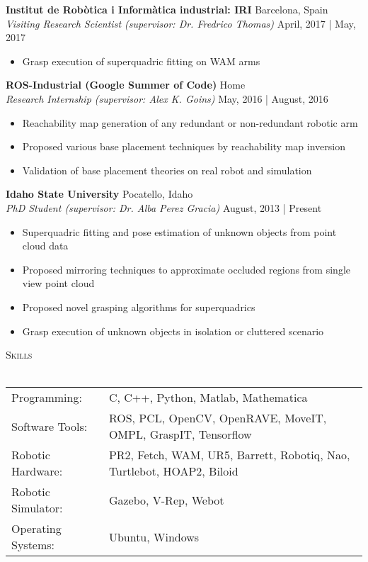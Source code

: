 \documentclass[a4paper]{article}
\newcommand{\lineunder} {
    \vspace*{-8pt} \\
    \hspace*{-18pt} \hrulefill \\
}
\newcommand{\header} [1] {
    {\hspace*{-18pt}\vspace*{6pt} \textsc{#1}}
    \vspace*{-6pt} \lineunder
}
\begin{document}
\textbf{Institut de Rob\`{o}tica i Inform\`{a}tica industrial: IRI} \hfill Barcelona, Spain\\
\textit{Visiting Research Scientist (supervisor: Dr. Fredrico Thomas)} \hfill April, 2017 | May, 2017\\
\vspace{-1mm}
\begin{itemize} \itemsep 1pt
	\item Grasp execution of superquadric fitting on WAM arms
\end{itemize}

\textbf{ROS-Industrial (Google Summer of Code)} \hfill Home\\
\textit{Research Internship (supervisor: Alex K. Goins)} \hfill May, 2016 | August, 2016\\
\vspace{-1mm}
\begin{itemize} \itemsep 1pt
	\item Reachability map generation of any redundant or non-redundant robotic arm
	\item Proposed various base placement techniques by reachability map inversion
	\item Validation of base placement theories on real robot and simulation
\end{itemize}

\textbf{Idaho State University} \hfill Pocatello, Idaho\\
\textit{PhD Student (supervisor: Dr. Alba Perez Gracia)} \hfill August, 2013 | Present\\
\vspace{-1mm}
\begin{itemize} \itemsep 1pt
	\item Superquadric fitting and pose estimation of unknown objects from point cloud data
	\item Proposed mirroring techniques to approximate occluded regions from single view point cloud
	\item Proposed novel grasping algorithms for superquadrics
	\item Grasp execution of unknown objects in isolation or cluttered scenario
\end{itemize}

\header{Skills}
\begin{tabular}{ l l }
	Programming:       & C, C++, Python, Matlab, Mathematica                                   \\
	Software Tools:    & ROS, PCL, OpenCV, OpenRAVE, MoveIT, OMPL, GraspIT, Tensorflow         \\
	Robotic Hardware:  & PR2, Fetch, WAM, UR5, Barrett, Robotiq, Nao, Turtlebot, HOAP2, Biloid \\
	Robotic Simulator: & Gazebo, V-Rep, Webot                                                  \\
	Operating Systems: & Ubuntu, Windows                                                       \\
\end{tabular}
\end{document}
